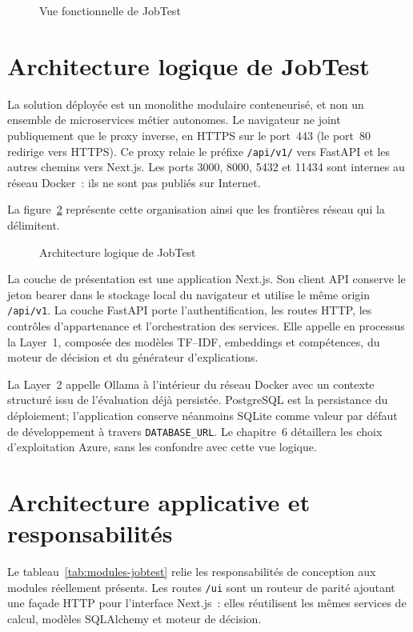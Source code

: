 \begin{figure}[htbp]
\centering

\caption{Vue fonctionnelle de JobTest}
\label{fig:fonctionnelle}
\end{figure}

\section{Architecture logique de JobTest}
La solution déployée est un monolithe modulaire conteneurisé, et non un ensemble de microservices métier autonomes. Le navigateur ne joint publiquement que le proxy inverse, en HTTPS sur le port~443 (le port~80 redirige vers HTTPS). Ce proxy relaie le préfixe \texttt{/api/v1/} vers FastAPI et les autres chemins vers Next.js. Les ports 3000, 8000, 5432 et 11434 sont internes au réseau Docker~: ils ne sont pas publiés sur Internet.

La figure~\ref{fig:architecture-logique} représente cette organisation ainsi que les frontières réseau qui la délimitent.

\begin{figure}[htbp]
\centering

\caption{Architecture logique de JobTest}
\label{fig:architecture-logique}
\end{figure}

La couche de présentation est une application Next.js. Son client API conserve le jeton bearer dans le stockage local du navigateur et utilise le même origin \texttt{/api/v1}. La couche FastAPI porte l'authentification, les routes HTTP, les contrôles d'appartenance et l'orchestration des services. Elle appelle en processus la Layer~1, composée des modèles TF--IDF, embeddings et compétences, du moteur de décision et du générateur d'explications.

La Layer~2 appelle Ollama à l'intérieur du réseau Docker avec un contexte structuré issu de l'évaluation déjà persistée. PostgreSQL est la persistance du déploiement; l'application conserve néanmoins SQLite comme valeur par défaut de développement à travers \texttt{DATABASE\_URL}. Le chapitre~6 détaillera les choix d'exploitation Azure, sans les confondre avec cette vue logique.

\section{Architecture applicative et responsabilités}
Le tableau~\ref{tab:modules-jobtest} relie les responsabilités de conception aux modules réellement présents. Les routes \texttt{/ui} sont un routeur de parité ajoutant une façade HTTP pour l'interface Next.js~: elles réutilisent les mêmes services de calcul, modèles SQLAlchemy et moteur de décision.

